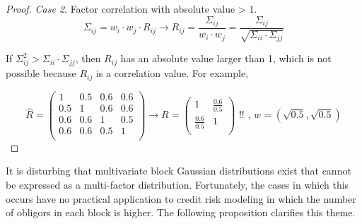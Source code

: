 \documentclass[11pt,fleqn]{book} %
\begin{document}
\begin{proof}
	\emph{Case 2}. Factor correlation with absolute value > 1.
	\begin{displaymath}
		\Sigma_{ij} = w_i \cdot w_j \cdot R_{ij} \longrightarrow 
		R_{ij} = \frac{\Sigma_{ij}}{w_i \cdot w_j} = 
		\frac{\Sigma_{ij}}{\sqrt{\Sigma_{ii} \cdot \Sigma_{jj}}}
	\end{displaymath}
	\begin{adjustwidth}{1cm}{0pt}
		If $\Sigma_{ij}^2 > \Sigma_{ii} \cdot \Sigma_{jj}$, then $R_{ij}$ has an 
		absolute value larger than 1, which is not possible because $R_{ij}$ 
		is a correlation value. For example,
	\end{adjustwidth}
	\begin{displaymath}
		\widehat{R} = \left(
		\begin{array}{cc|cc}
			1   & 0.5 & 0.6 & 0.6 \\
			0.5 & 1   & 0.6 & 0.6 \\
			\hline
			0.6 & 0.6 & 1   & 0.5 \\
			0.6 & 0.6 & 0.5 & 1   \\
		\end{array}
		\right) 
		\longrightarrow
		R = \left(
		\begin{array}{cc}
			1               & \frac{0.6}{0.5} \\
			\frac{0.6}{0.5} & 1               \\
		\end{array}
		\right)
		\text{ !!}
		\text{ , }
		w = (\sqrt{0.5}, \sqrt{0.5})
	\end{displaymath}
\end{proof}

It is disturbing that multivariate block Gaussian distributions exist
that cannot be expressed as a multi-factor distribution. Fortunately, the 
cases in which this occurs have no practical application to credit risk
modeling in which the number of obligors in each block is higher. 
The following proposition clarifies this theme.
\end{document}
